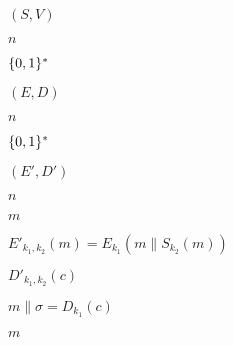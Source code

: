 \documentclass[10pt]{book}
\begin{document}
\begin{mdSnippets}
\begin{mdInlineSnippet}[134d0e1645a1f38f9d7ef80d95389edd]%
$(S,V)$\end{mdInlineSnippet}%
\begin{mdInlineSnippet}[7b8b965ad4bca0e41ab51de7b31363a1]%
$n$\end{mdInlineSnippet}%
\begin{mdInlineSnippet}%
$\{0,1\}^*$\end{mdInlineSnippet}%
\begin{mdInlineSnippet}[c150726dc018e82825c0c3617f46a1c9]%
$(E,D)$\end{mdInlineSnippet}%
\begin{mdInlineSnippet}[7b8b965ad4bca0e41ab51de7b31363a1]%
$n$\end{mdInlineSnippet}%
\begin{mdInlineSnippet}%
$\{0,1\}^*$\end{mdInlineSnippet}%
\begin{mdInlineSnippet}%
$(E',D')$\end{mdInlineSnippet}%
\begin{mdInlineSnippet}[7b8b965ad4bca0e41ab51de7b31363a1]%
$n$\end{mdInlineSnippet}%
\begin{mdInlineSnippet}[6f8f57715090da2632453988d9a1501b]%
$m$\end{mdInlineSnippet}%
\begin{mdInlineSnippet}%
$E'_{k_1,k_2}(m) = E_{k_1}(m\|S_{k_2}(m))$\end{mdInlineSnippet}%
\begin{mdInlineSnippet}[7b2e643d626b92d4e29396d489ebbcbf]%
$D'_{k_1,k_2}(c)$\end{mdInlineSnippet}%
\begin{mdInlineSnippet}%
$m\|\sigma=D_{k_1}(c)$\end{mdInlineSnippet}%
\begin{mdInlineSnippet}[6f8f57715090da2632453988d9a1501b]%
$m$\end{mdInlineSnippet}%

\end{mdSnippets}
\end{document}
